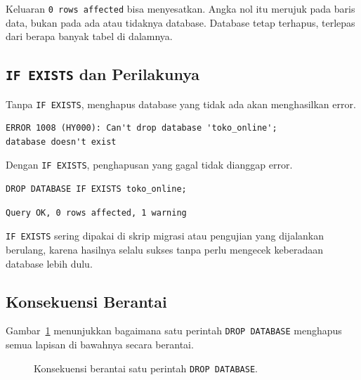 \documentclass[11pt,a4paper]{article}
\begin{document}
Keluaran \texttt{0 rows affected} bisa menyesatkan. Angka nol itu merujuk pada baris data, bukan pada ada atau tidaknya database. Database tetap terhapus, terlepas dari berapa banyak tabel di dalamnya.

\subsection{\texttt{IF EXISTS} dan Perilakunya}

Tanpa \texttt{IF EXISTS}, menghapus database yang tidak ada akan menghasilkan error.

\begin{lstlisting}[style=out]
ERROR 1008 (HY000): Can't drop database 'toko_online';
database doesn't exist
\end{lstlisting}

Dengan \texttt{IF EXISTS}, penghapusan yang gagal tidak dianggap error.

\begin{lstlisting}[style=code]
DROP DATABASE IF EXISTS toko_online;
\end{lstlisting}

\begin{lstlisting}[style=out]
Query OK, 0 rows affected, 1 warning
\end{lstlisting}

\texttt{IF EXISTS} sering dipakai di skrip migrasi atau pengujian yang dijalankan berulang, karena hasilnya selalu sukses tanpa perlu mengecek keberadaan database lebih dulu.

\subsection{Konsekuensi Berantai}

Gambar~\ref{fig:drop-cascade} menunjukkan bagaimana satu perintah \texttt{DROP DATABASE} menghapus semua lapisan di bawahnya secara berantai.

\begin{figure}[H]
	\centering
	\caption{Konsekuensi berantai satu perintah \texttt{DROP DATABASE}.}
	\label{fig:drop-cascade}
\end{figure}
\end{document}
